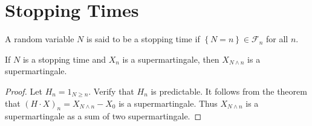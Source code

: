 \section{Stopping Times}
\begin{definition}
    A random variable $N$ is said to be a stopping time if $\left\{N=n\right\}\in\mathcal{F}_n$ for all $n$.
\end{definition}
\begin{corollary}
    If $N$ is a stopping time and $X_n$ is a supermartingale, then $X_{N\wedge n}$ is a supermartingale.
\end{corollary}
\begin{proof}
    Let $H_n=1_{N\geq n}$. Verify that $H_n$ is predictable. It follows from the theorem that $(H\cdot X)_n=X_{N\wedge n}-X_0$ is a supermartingale. Thus $X_{N\wedge n}$ is a supermartingale as a sum of two supermartingale.
\end{proof}


